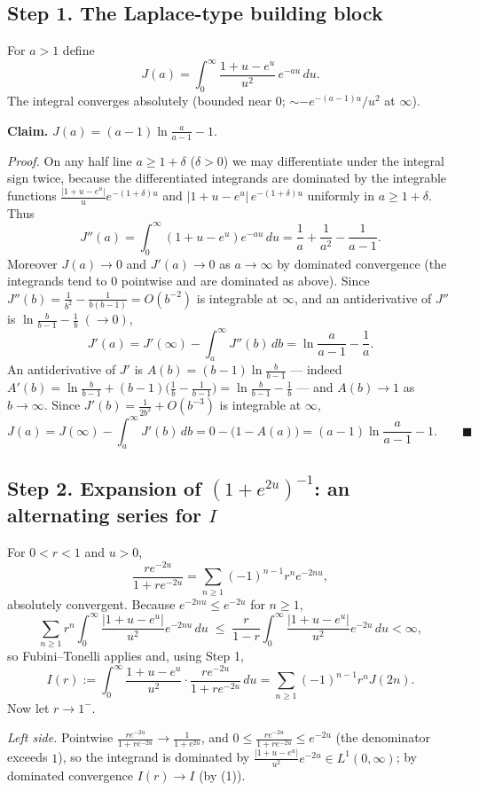 \documentclass[11pt]{article}
\theoremstyle{remark}
\begin{document}
\subsection*{Step 1. The Laplace-type building block}

For $a>1$ define
$$
J(a)=\int_0^\infty\frac{1+u-e^{u}}{u^{2}}\,e^{-au}\,du .
$$
The integral converges absolutely (bounded near $0$; $\sim -e^{-(a-1)u}/u^2$ at $\infty$).

\textbf{Claim.} $\displaystyle J(a)=(a-1)\ln\frac{a}{a-1}-1$.

\emph{Proof.} On any half line $a\ge 1+\delta$ ($\delta>0$) we may differentiate under the integral sign twice, because the differentiated integrands are dominated by the integrable functions $\frac{|1+u-e^u|}{u}e^{-(1+\delta)u}$ and $|1+u-e^u|\,e^{-(1+\delta)u}$ uniformly in $a\ge1+\delta$. Thus
$$
J''(a)=\int_0^\infty(1+u-e^{u})e^{-au}\,du=\frac1a+\frac1{a^{2}}-\frac1{a-1}.
$$
Moreover $J(a)\to0$ and $J'(a)\to0$ as $a\to\infty$ by dominated convergence (the integrands tend to $0$ pointwise and are dominated as above). Since $J''(b)=\frac1{b^2}-\frac1{b(b-1)}=O(b^{-2})$ is integrable at $\infty$, and an antiderivative of $J''$ is $\ln\frac{b}{b-1}-\frac1b\;(\to 0)$,
$$
J'(a)=J'(\infty)-\int_a^\infty J''(b)\,db=\ln\frac{a}{a-1}-\frac1a .
$$
An antiderivative of $J'$ is $A(b)=(b-1)\ln\frac{b}{b-1}$ --- indeed $A'(b)=\ln\frac{b}{b-1}+(b-1)\bigl(\frac1b-\frac1{b-1}\bigr)=\ln\frac{b}{b-1}-\frac1b$ --- and $A(b)\to1$ as $b\to\infty$. Since $J'(b)=\frac{1}{2b^{2}}+O(b^{-3})$ is integrable at $\infty$,
$$
J(a)=J(\infty)-\int_a^\infty J'(b)\,db=0-\bigl(1-A(a)\bigr)=(a-1)\ln\frac{a}{a-1}-1 .\qquad\blacksquare
$$

\subsection*{Step 2. Expansion of $(1+e^{2u})^{-1}$: an alternating series for $I$}

For $0<r<1$ and $u>0$,
$$
\frac{r e^{-2u}}{1+re^{-2u}}=\sum_{n\ge1}(-1)^{n-1}r^{n}e^{-2nu},
$$
absolutely convergent. Because $e^{-2nu}\le e^{-2u}$ for $n\ge1$,
$$
\sum_{n\ge1} r^{n}\int_0^\infty\frac{|1+u-e^{u}|}{u^{2}}e^{-2nu}\,du
\;\le\;\frac{r}{1-r}\int_0^\infty\frac{|1+u-e^{u}|}{u^{2}}e^{-2u}\,du<\infty ,
$$
so Fubini--Tonelli applies and, using Step 1,
$$
I(r):=\int_0^\infty\frac{1+u-e^{u}}{u^{2}}\cdot\frac{r e^{-2u}}{1+re^{-2u}}\,du
=\sum_{n\ge1}(-1)^{n-1}r^{n}J(2n).
$$
Now let $r\to1^-$.

\emph{Left side.} Pointwise $\frac{r e^{-2u}}{1+re^{-2u}}\to\frac{1}{1+e^{2u}}$, and $0\le\frac{r e^{-2u}}{1+re^{-2u}}\le e^{-2u}$ (the denominator exceeds $1$), so the integrand is dominated by $\frac{|1+u-e^{u}|}{u^{2}}e^{-2u}\in L^{1}(0,\infty)$; by dominated convergence $I(r)\to I$ (by (1)).
\end{document}
